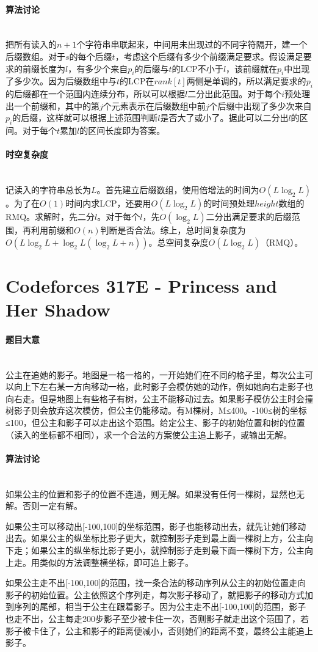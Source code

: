 \documentclass[UTF8]{ctexart}
\newcommand{\myparagraph}[1]{\paragraph{#1}\mbox{}\\}
\theoremstyle{nonumberplain}
\begin{document}
		\myparagraph{算法讨论}
		
			把所有读入的$n+1$个字符串串联起来，中间用未出现过的不同字符隔开，建一个后缀数组。对于$s$的每个后缀$t$，考虑这个后缀有多少个前缀满足要求。假设满足要求的前缀长度为$l$，有多少个来自$p_i$的后缀与$t$的LCP不小于$l$，该前缀就在$p_i$中出现了多少次。因为后缀数组中与$t$的LCP在$rank[t]$两侧是单调的，所以满足要求的$p_i$的后缀都在一个范围内连续分布，所以可以根据$l$二分出此范围。对于每个$i$预处理出一个前缀和，其中的第$j$个元素表示在后缀数组中前$j$个后缀中出现了多少次来自$p_i$的后缀，这样就可以根据上述范围判断$l$是否大了或小了。据此可以二分出$l$的区间。对于每个$t$累加$l$的区间长度即为答案。
		
		\myparagraph{时空复杂度}
		
			记读入的字符串总长为$L$。首先建立后缀数组，使用倍增法的时间为$O(L\log_2L)$。为了在$O(1)$时间内求LCP，还要用$O(L\log_2L)$的时间预处理$height$数组的RMQ。求解时，先二分$l$。对于每个$l$，先$O(\log_2L)$二分出满足要求的后缀范围，再利用前缀和$O(n)$判断是否合法。综上，总时间复杂度为$O(L\log_2L+\log_2L(\log_2L+n))$。总空间复杂度$O(L\log_2L)$（RMQ）。
	
	\section{Codeforces 317E - Princess and Her Shadow}
	
		\myparagraph{题目大意}
		
			公主在追她的影子。地图是一格一格的，一开始她们在不同的格子里，每次公主可以向上下左右某一方向移动一格，此时影子会模仿她的动作，例如她向右走影子也向右走。但是地图上有些格子有树，公主不能移动过去。如果影子模仿公主时会撞树影子则会放弃这次模仿，但公主仍能移动。有M棵树，M≤400。-100≤树的坐标≤100，但公主和影子可以走出这个范围。给定公主、影子的初始位置和树的位置（读入的坐标都不相同），求一个合法的方案使公主追上影子，或输出无解。
		
		\myparagraph{算法讨论}
			
			如果公主的位置和影子的位置不连通，则无解。如果没有任何一棵树，显然也无解。否则一定有解。
			
			如果公主可以移动出[-100,100]的坐标范围，影子也能移动出去，就先让她们移动出去。如果公主的纵坐标比影子更大，就控制影子走到最上面一棵树上方，公主向下走；如果公主的纵坐标比影子更小，就控制影子走到最下面一棵树下方，公主向上走。用类似的方法调整横坐标，即可追上影子。
			
			如果公主走不出[-100,100]的范围，找一条合法的移动序列从公主的初始位置走向影子的初始位置。公主依照这个序列走，每次影子移动了，就把影子的移动方式加到序列的尾部，相当于公主在跟着影子。因为公主走不出[-100,100]的范围，影子也走不出，公主每走200步影子至少被卡住一次，否则影子就走出这个范围了，若影子被卡住了，公主和影子的距离便减小，否则她们的距离不变，最终公主能追上影子。
			
\end{document}
